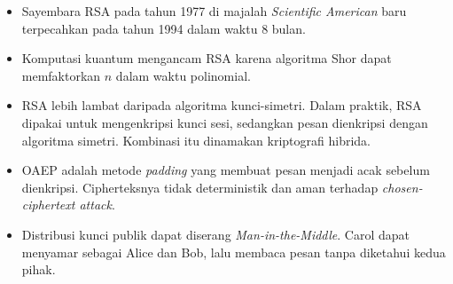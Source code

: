 \begin{itemize}
          difaktorkan dalam beberapa jam, sedangkan modulus 512 bit memerlukan
          beberapa ratus komputer. Bahan kuliah ini menyatakan bahwa $n$ di
          atas 1024 bit baru dianggap aman.
    \item Sayembara RSA pada tahun 1977 di majalah \textit{Scientific American}
          baru terpecahkan pada tahun 1994 dalam waktu 8 bulan.
    \item Komputasi kuantum mengancam RSA karena algoritma Shor dapat
          memfaktorkan $n$ dalam waktu polinomial.
    \item RSA lebih lambat daripada algoritma kunci-simetri. Dalam praktik,
          RSA dipakai untuk mengenkripsi kunci sesi, sedangkan pesan
          dienkripsi dengan algoritma simetri. Kombinasi itu dinamakan
          kriptografi hibrida.
    \item OAEP adalah metode \textit{padding} yang membuat pesan menjadi acak
          sebelum dienkripsi. Cipherteksnya tidak deterministik dan aman
          terhadap \textit{chosen-ciphertext attack}.
    \item Distribusi kunci publik dapat diserang \textit{Man-in-the-Middle}.
          Carol dapat menyamar sebagai Alice dan Bob, lalu membaca pesan tanpa
          diketahui kedua pihak.
\end{itemize}
